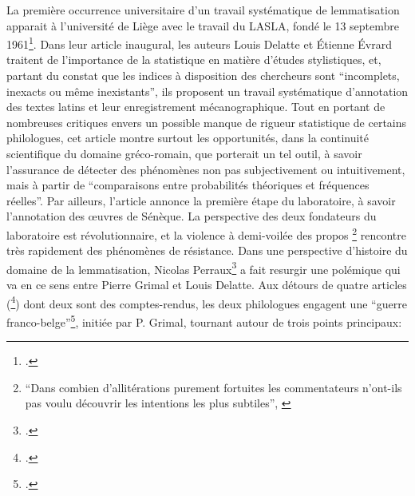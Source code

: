 La première occurrence universitaire d'un travail systématique de lemmatisation apparait à l'université de Liège avec le travail du LASLA, fondé le 13 septembre 1961\footcite{delatte_laboratoire_1961}. Dans leur article inaugural, les auteurs Louis Delatte et Étienne Évrard traitent de l'importance de la statistique en matière d'études stylistiques, et, partant du constat que les indices à disposition des chercheurs sont \enquote{incomplets, inexacts ou même inexistants}, ils proposent un travail systématique d'annotation des textes latins et leur enregistrement mécanographique. Tout en portant de nombreuses critiques envers un possible manque de rigueur statistique de certains philologues, cet article montre surtout les opportunités, dans la continuité scientifique du domaine gréco-romain, que porterait un tel outil, à savoir l'assurance de détecter des phénomènes non pas subjectivement ou intuitivement, mais à partir de \enquote{comparaisons entre probabilités théoriques et fréquences réelles}. Par ailleurs, l'article annonce la première étape du laboratoire, à savoir l'annotation des œuvres de Sénèque. La perspective des deux fondateurs du laboratoire est révolutionnaire, et la violence à demi-voilée des propos \footnote{\enquote{Dans combien d'allitérations purement fortuites les commentateurs n'ont-ils pas voulu découvrir les intentions les plus subtiles}, \cite[p.~442]{delatte_laboratoire_1961}} rencontre très rapidement des phénomènes de résistance. Dans une perspective d'histoire du domaine de la lemmatisation, Nicolas Perraux\footcite{perreaux_lemmatisation_2019} a fait resurgir une polémique qui va en ce sens entre Pierre Grimal et Louis Delatte. Aux détours de quatre articles (\footcites{grimal_delatte_1964}{delatte_propos_1965}{grimal_index_1966}{delatte_index_1968}) dont deux sont des comptes-rendus, les deux philologues engagent une \enquote{guerre franco-belge}\footcite{verdiere_pierre_1970}, initiée par P. Grimal, tournant autour de trois points principaux:
